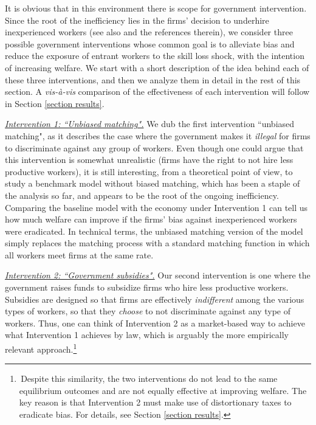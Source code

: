 \documentclass[12pt]{article} %
\theoremstyle{definition}
\begin{document}
  
It is obvious that in this environment there is scope for government intervention. Since the root of the inefficiency lies in the firms' decision to underhire inexperienced workers (see also \cite{pallais2014inefficient} and the references therein), we consider three possible government interventions whose common goal is to alleviate bias and reduce the exposure of entrant workers to the skill loss shock, with the intention of increasing welfare. We start with a short description of the idea behind each of these three interventions, and then we analyze them in detail in the rest of this section. A \textit{vis-\`a-vis} comparison of the effectiveness of each intervention will follow in Section \ref{section results}. 

\medskip

\underline{\textit{Intervention 1: ``Unbiased matching".}} We dub the first intervention ``unbiased matching", as it describes the case where the government makes it \textit{illegal} for firms to discriminate against any group of workers. Even though one could argue that this intervention is somewhat unrealistic (firms have the right to not hire less productive workers), it is still interesting, from a theoretical point of view, to study a benchmark model without biased matching, which has been a staple of the analysis so far, and appears to be the root of the ongoing inefficiency. Comparing the baseline model with the economy under Intervention 1 can tell us how much welfare can improve if the firms' bias against inexperienced workers were eradicated. In technical terms, the unbiased matching version of the model simply replaces the \cite{petrongolo2001looking} matching process with a standard \cite{pissarides2000equilibrium} matching function in which all workers meet firms at the same rate. 

\medskip

\underline{\textit{Intervention 2: ``Government subsidies".}} Our second intervention is one where the government raises funds to subsidize firms who hire less productive workers. Subsidies are designed so that firms are effectively \textit{indifferent} among the various types of workers, so that they \textit{choose} to not discriminate against any type of workers. Thus, one can think of Intervention 2 as a market-based way to achieve what Intervention 1 achieves by law, which is arguably the more empirically relevant approach.\footnote{\,Despite this similarity, the two interventions do not lead to the same equilibrium outcomes and are not equally effective at improving welfare. The key reason is that Intervention 2 must make use of distortionary taxes to eradicate bias. For details, see Section \ref{section results}.} 
\end{document}
